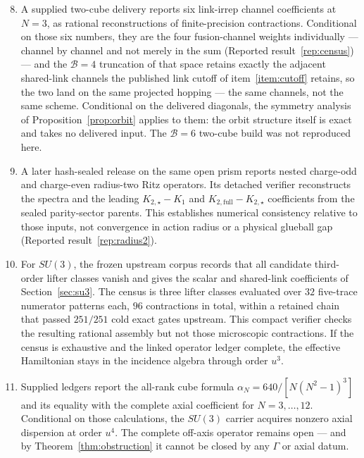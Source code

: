 \documentclass[11pt]{article}
\theoremstyle{plain}
\theoremstyle{definition}
\theoremstyle{remark}
\begin{document}
\begin{enumerate}\setcounter{enumi}{7}\itemsep2pt
\item A supplied two-cube delivery reports six link-irrep channel
  coefficients at $N=3$, as rational reconstructions of finite-precision
  contractions. Conditional on those six numbers, they are the four
  fusion-channel weights individually --- channel by channel and not merely in
  the sum (Reported result~\ref{rep:census}) --- and the $\mathcal B=4$ truncation of
  that space retains exactly the adjacent shared-link channels the published
  link cutoff of item~\ref{item:cutoff} retains, so the two land on the same
  projected hopping --- the same channels, not the same scheme. Conditional on the delivered diagonals, the symmetry
  analysis of Proposition~\ref{prop:orbit} applies to them: the orbit structure
  itself is exact and takes no delivered input.
  The $\mathcal B=6$ two-cube build was not reproduced here.
\item A later hash-sealed release on the same open prism reports nested
  charge-odd and charge-even radius-two Ritz operators. Its detached verifier
  reconstructs the spectra and the leading $K_{2,\star}-K_1$ and
  $K_{2,\mathrm{full}}-K_{2,\star}$ coefficients from the sealed parity-sector
  parents. This establishes numerical consistency relative to those inputs,
  not convergence in action radius or a physical glueball gap
  (Reported result~\ref{rep:radius2}).
\item\label{item:domino} For $SU(3)$, the frozen upstream corpus records that
  all candidate third-order lifter classes vanish and gives the scalar and
  shared-link coefficients of Section~\ref{sec:su3}. The census is three
  lifter classes evaluated over $32$ five-trace numerator patterns each, $96$
  contractions in total, within a retained chain that passed $251/251$ cold
  exact gates upstream. This compact verifier checks the resulting rational
  assembly but not those microscopic contractions. If the census is exhaustive
  and the linked operator ledger complete, the effective Hamiltonian stays in
  the incidence algebra through order $u^3$.
\item Supplied ledgers report the all-rank cube formula
  $\alpha_N=640/[N(N^2-1)^3]$ and its equality with the complete axial
  coefficient for $N=3,\dots,12$. Conditional on those calculations, the
  $SU(3)$ carrier acquires nonzero axial dispersion at order $u^4$. The
  complete off-axis operator remains open --- and by
  Theorem~\ref{thm:obstruction} it cannot be closed by any $\Gamma$ or axial
  datum.
\end{enumerate}
\end{document}
